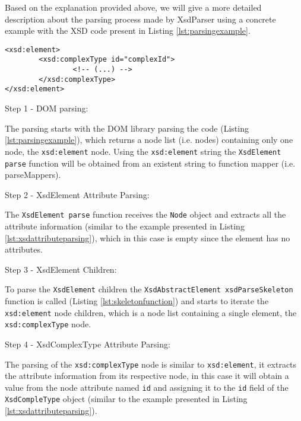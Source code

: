 \newpage

\noindent
Based on the explanation provided above, we will give a more detailed description about the parsing process made by XsdParser using a concrete example with the \ac{XSD} code present in Listing \ref{lst:parsingexample}.

\bigskip


\begin{minipage}{\linewidth}
\begin{lstlisting}[caption={Parsing Concrete Example},captionpos=b,label={lst:parsingexample}]
<xsd:element>
		<xsd:complexType id="complexId">
				<!-- (...) -->
		</xsd:complexType>
</xsd:element>
\end{lstlisting}
\end{minipage}


Step 1 - DOM parsing:

\noindent
The parsing starts with the \ac{DOM} library parsing the code (Listing \ref{lst:parsingexample}), which returns a node list (i.e. nodes) containing only one node, the \texttt{xsd:element} node. Using the \texttt{xsd:element} string the \texttt{XsdElement parse} function will be obtained from an existent string to function mapper (i.e. parseMappers). 

Step 2 - XsdElement Attribute Parsing:

\noindent
The \texttt{XsdElement parse} function receives the \texttt{Node} object and extracts all the attribute information (similar to the example presented in Listing \ref{lst:xsdattributeparsing}), which in this case is empty since the element has no attributes. 

Step 3 - XsdElement Children:

\noindent
To parse the \texttt{XsdElement} children the \texttt{XsdAbstractElement xsdParseSkeleton} function is called (Listing \ref{lst:skeletonfunction}) and starts to iterate the \texttt{xsd:element} node children, which is a node list containing a single element, the \texttt{xsd:complexType} node. 

Step 4 - XsdComplexType Attribute Parsing:

\noindent
The parsing of the \texttt{xsd:complexType} node is similar to \texttt{xsd:element}, it extracts the attribute information from its respective node, in this case it will obtain a value from the node attribute named \texttt{id} and assigning it to the \texttt{id} field of the \texttt{XsdCompleType} object (similar to the example presented in Listing \ref{lst:xsdattributeparsing}). 

